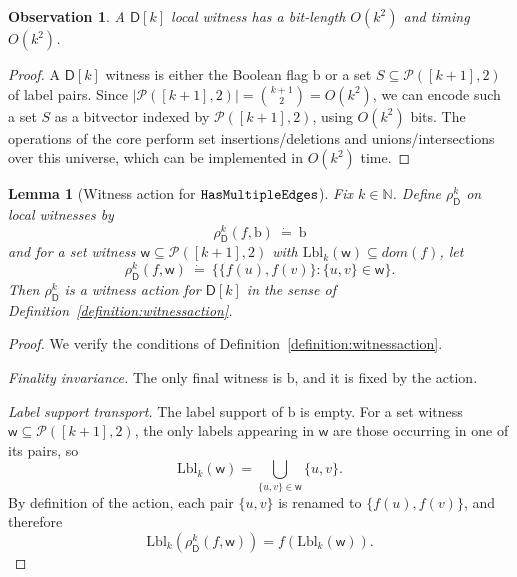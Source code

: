 \documentclass[11pt,a4paper]{article}
\newtheorem{lemma}[theorem]{Lemma}
\newtheorem{observation}[theorem]{Observation}
\newcommand{\treewidthvalue}{k}
\newcommand{\N}{\mathbb{N}}
\newcommand{\defeq}{~\dot{=}~}
\newcommand{\awitness}{\mathsf{w}}
\newcommand{\powersetchoosek}[2]{\mathcal{P}(#1,#2)}
\newcommand{\dpcore}{\mathsf{D}}
\newcommand{\dpNamePart}[1]{\mbox{\normalfont\ttfamily #1}}
\newcommand{\hasMultiEdgeCore}{\dpNamePart{HasMultipleEdges}}
\newcommand{\domain}{dom}
\newcommand{\multiedgefound}{\mathrm{b}}
\newcommand{\relabelingfunction}{f}
\newcommand{\action}{\rho}
\begin{document}
{	\begin{observation}
		\label{observation:ComplexityMeasuresHasMultiEdge}
		A \(\dpcore[\treewidthvalue]\) local witness has a bit-length
		\(O(\treewidthvalue^2)\) and timing \(O(\treewidthvalue^2)\).
	\end{observation}
	\begin{proof}
		A \(\dpcore[\treewidthvalue]\) witness is either the Boolean flag \(\multiedgefound\) or a set \(S\subseteq \powersetchoosek{[\treewidthvalue+1]}{2}\) of label pairs.
		Since \(|\powersetchoosek{[\treewidthvalue+1]}{2}|=\binom{\treewidthvalue+1}{2}=O(\treewidthvalue^2)\), we can encode such a set \(S\) as a bitvector indexed by \(\powersetchoosek{[\treewidthvalue+1]}{2}\), using \(O(\treewidthvalue^2)\) bits.
		The operations of the core perform set insertions/deletions and unions/intersections over this universe, which can be implemented in \(O(\treewidthvalue^2)\) time.
	\end{proof}

		\begin{lemma}[Witness action for $\hasMultiEdgeCore$]
	\label{lemma:witness-action-multiedge}
	Fix $\treewidthvalue\in \N$.
	Define $\action_{\dpcore}^{\treewidthvalue}$ on local witnesses by
	\[
	\action_{\dpcore}^{\treewidthvalue}(\relabelingfunction,\multiedgefound)\defeq \multiedgefound
	\]
	and for a set witness $\awitness\subseteq \powersetchoosek{[\treewidthvalue+1]}{2}$ with $\mathrm{Lbl}_{\treewidthvalue}(\awitness)\subseteq \domain(\relabelingfunction)$, let
	\[
	\action_{\dpcore}^{\treewidthvalue}(\relabelingfunction,\awitness)
	\defeq
	\bigl\{\{\relabelingfunction(u),\relabelingfunction(v)\} : \{u,v\}\in \awitness\bigr\}.
	\]
	Then $\action_{\dpcore}^{\treewidthvalue}$ is a witness action for $\dpcore[\treewidthvalue]$ in the sense of Definition~\ref{definition:witnessaction}.
	\end{lemma}
	\begin{proof}
	We verify the conditions of Definition~\ref{definition:witnessaction}.

	\smallskip\noindent
	\emph{Finality invariance.}
	The only final witness is $\multiedgefound$, and it is fixed by the action.

	\smallskip\noindent
	\emph{Label support transport.}
	The label support of $\multiedgefound$ is empty. For a set witness $\awitness\subseteq \powersetchoosek{[\treewidthvalue+1]}{2}$, the only labels appearing in $\awitness$ are those occurring in one of its pairs, so
	\[
	\mathrm{Lbl}_{\treewidthvalue}(\awitness)=\bigcup_{\{u,v\}\in \awitness}\{u,v\}.
		\]
		By definition of the action, each pair $\{u,v\}$ is renamed to $\{\relabelingfunction(u),\relabelingfunction(v)\}$, and therefore
		\[
		\mathrm{Lbl}_{\treewidthvalue}(\action_{\dpcore}^{\treewidthvalue}(\relabelingfunction,\awitness))
		=\relabelingfunction(\mathrm{Lbl}_{\treewidthvalue}(\awitness)).
		\]


\end{proof}}
\end{document}
